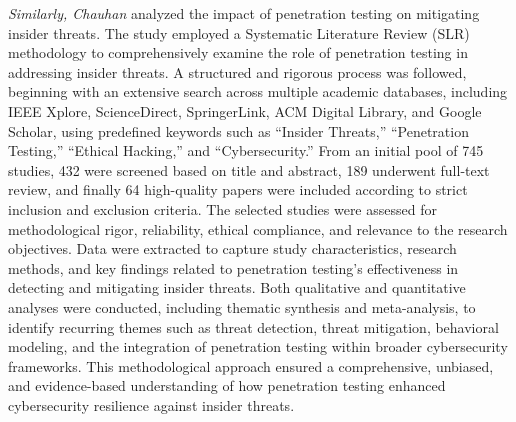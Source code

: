 \textit{Similarly, Chauhan} analyzed the impact of penetration testing on mitigating insider threats. The study employed a Systematic Literature Review (SLR) methodology to comprehensively examine the role of penetration testing in addressing insider threats. A structured and rigorous process was followed, beginning with an extensive search across multiple academic databases, including IEEE Xplore, ScienceDirect, SpringerLink, ACM Digital Library, and Google Scholar, using predefined keywords such as ``Insider Threats,'' ``Penetration Testing,'' ``Ethical Hacking,'' and ``Cybersecurity.'' From an initial pool of 745 studies, 432 were screened based on title and abstract, 189 underwent full-text review, and finally 64 high-quality papers were included according to strict inclusion and exclusion criteria. The selected studies were assessed for methodological rigor, reliability, ethical compliance, and relevance to the research objectives. Data were extracted to capture study characteristics, research methods, and key findings related to penetration testing's effectiveness in detecting and mitigating insider threats. Both qualitative and quantitative analyses were conducted, including thematic synthesis and meta-analysis, to identify recurring themes such as threat detection, threat mitigation, behavioral modeling, and the integration of penetration testing within broader cybersecurity frameworks. This methodological approach ensured a comprehensive, unbiased, and evidence-based understanding of how penetration testing enhanced cybersecurity resilience against insider threats. \cite{chauhan2024}

